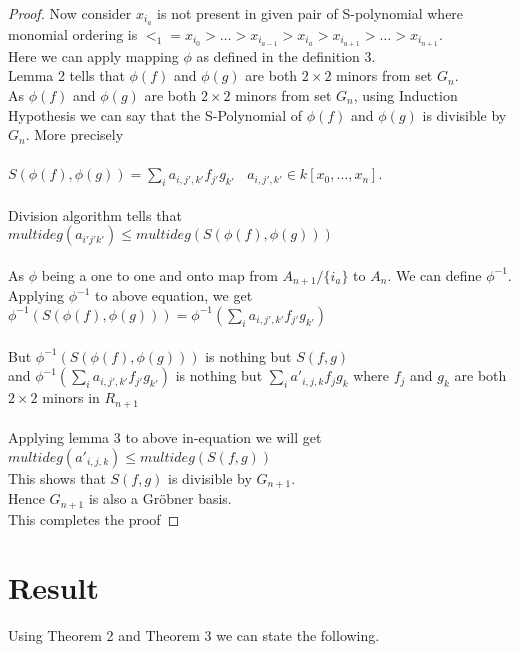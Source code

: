 \documentclass[12pt,a4paper]{article}
\theoremstyle{definition}
\begin{document}
\begin{proof}
Now consider $x_{i_{a}}$ is not present in given pair of S-polynomial where monomial ordering is $<_1=x_{i_{0}} > \ldots > x_{i_{a-1}} > x_{i_{a}} > x_{i_{a+1}} > \ldots > x_{i_{n+1}}$.\\
Here we can apply mapping $\phi$ as defined in the definition 3.\\
Lemma 2 tells that $\phi(f)$ and $\phi(g)$ are both $2 \times 2$ minors from set $G_{n}$. \\
As $\phi(f)$ and $\phi(g)$ are both $2 \times 2$ minors from set $G_{n}$, using Induction Hypothesis we can say that the S-Polynomial of $\phi(f)$ and $\phi(g)$
is divisible by $G_{n}$. More precisely \\
\\
$S(\phi(f), \phi(g))=\sum\limits_{i} a_{i,j',k'}f_{j'}g_{k'}\ \ \ \ a_{i,j',k'} \in k[x_{0}, \ldots, x_{n}]$.
\\
\\
Division algorithm tells that\\
$multideg(a_{i'j'k'}) \leq multideg(S(\phi(f),\phi(g)))$\\
\\
As $\phi$ being a one to one and onto map from $A_{n+1}/\{i_{a}\}$ to $A_{n}$. We can define $\phi^{-1}$.\\
Applying $\phi^{-1}$ to above equation, we get\\
$\phi^{-1}(S(\phi(f), \phi(g)))=\phi^{-1}(\sum\limits_{i}a_{i,j',k'}f_{j'}g_{k'})$
\\
\\
But $\phi^{-1}(S(\phi(f), \phi(g)))$ is nothing but $S(f, g)$\\
and $\phi^{-1}(\sum\limits_{i}a_{i,j',k'}f_{j'}g_{k'})$ is nothing but $\sum\limits_{i}a'_{i,j,k}f_{j}g_{k}$ where $f_{j}$ and $g_{k}$ are both $2\times 2$ minors in $R_{n+1}$\\
\\
Applying lemma 3 to above in-equation we will get\\
$multideg(a'_{i,j,k}) \leq multideg(S(f,g))$
\\
This shows that $S(f,g)$ is divisible by $G_{n+1}$.\\
Hence $G_{n+1}$ is also a Gr\"{o}bner basis.\\
This completes the proof




\end{proof}



\section*{Result}
Using Theorem 2 and Theorem 3 we can state the following.\\
\\
\end{document}
